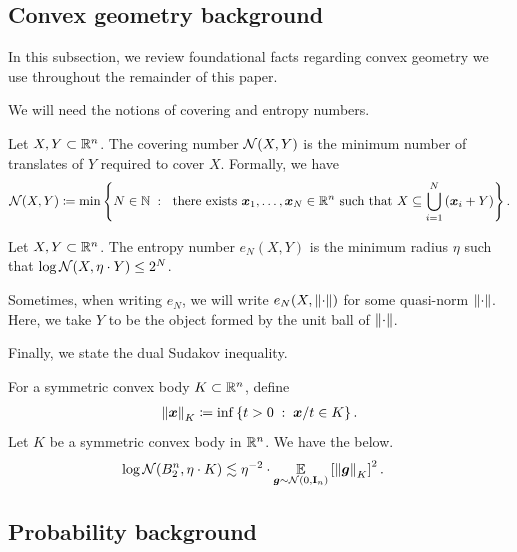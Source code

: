 \documentclass[11pt]{article}
\numberwithin{equation}{section}
\begin{document}
\subsection{Convex geometry background}
\label{sec:convex_geo_background}

In this subsection, we review foundational facts regarding convex geometry we use throughout the remainder of this paper. 

We will need the notions of covering and entropy numbers. 
\begin{definition}
\label{defn:covering_numbers}
Let $X, Y \subset \mathbb{R}^n$. The covering number $\mathcal{N}(X,Y)$ is the minimum number of translates of $Y$ required to cover $X$. Formally, we have
\begin{align*}
    \mathcal{N}(X,Y) \coloneqq \min\left\{N \in \mathbb{N} {\;\; : \;\;} \text{ there exists } \bm{x}_1,\dots,\bm{x}_N \in \mathbb{R}^n \text{ such that } X \subseteq \bigcup_{i=1}^N \left(\bm{x}_i + Y\right)\right\}.
\end{align*}
\end{definition}

\begin{definition}
\label{defn:entropy_numbers}
Let $X, Y \subset \mathbb{R}^n$. The entropy number $e_N(X,Y)$ is the minimum radius $\eta$ such that $\log\mathcal{N}(X,\eta \cdot Y) \le 2^N$.
\end{definition}

Sometimes, when writing $e_N$, we will write $e_N(X,\left\lVert \cdot \right\rVert)$ for some quasi-norm $\left\lVert \cdot \right\rVert$. Here, we take $Y$ to be the object formed by the unit ball of $\left\lVert \cdot \right\rVert$.

Finally, we state the dual Sudakov inequality.
\begin{fact}
\label{fact:sudakov}
For a symmetric convex body $K \subset \mathbb{R}^n$, define
\begin{align*}
    \left\lVert \bm{x} \right\rVert_K \coloneqq \inf\left\{t > 0 {\;\; : \;\;} \bm{x}/t \in K\right\}.
\end{align*}
Let $K$ be a symmetric convex body in $\mathbb{R}^n$. We have the below.
\begin{align}
    \log\mathcal{N}(B_2^n, \eta \cdot K) &\lesssim \eta^{-2} \cdot \underset{\bm{g}\sim\mathcal{N}(0,\mathbf{I}_n)}{\mathbb{E}}\left[\left\lVert \bm{g} \right\rVert_K\right]^2.\label{eq:sudakov_dual}
\end{align}
\end{fact}

\subsection{Probability background}
\end{document}
